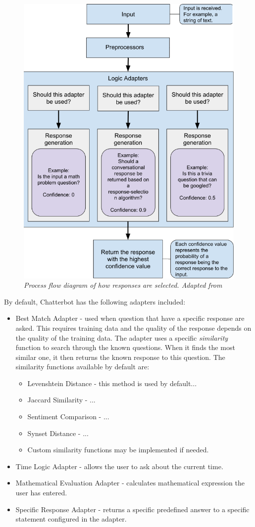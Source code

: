 \documentclass[12pt,a4paper]{article}
\newcommand{\captionstyle}[1] {
    \small{\textit{#1}}
}
\begin{document}
\begin{figure}[!htb]%
    \centering
    \includegraphics[width=0.7\columnwidth]{dialog-processing-flow}%
    \caption{\captionstyle{Process flow diagram of how responses are selected. Adapted from \cite{Chatterbot:online}}}%
    \label{fig:dialog-processing-flow}%
\end{figure}


By default, Chatterbot has the following adapters included:
\begin{itemize}
    \item Best Match Adapter - used when question that have a specific response are asked. This requires training data and the quality of the response depends on the quality of the training data. The adapter uses a specific \textit{similarity} function to search through the known questions. When it finds the most similar one, it then returns the known response to this question. The similarity functions available by default are:
        \begin{itemize}
            \item Levenshtein Distance - this method is used by default...
            \item Jaccard Similarity - ...
            \item Sentiment Comparison - ...
            \item Synset Distance - ...
            \item Custom similarity functions may be implemented if needed.
        \end{itemize}
    \item Time Logic Adapter - allows the user to ask about the current time.
    \item Mathematical Evaluation Adapter - calculates mathematical expression the user has entered.
    \item Specific Response Adapter - returns a specific predefined answer to a specific statement configured in the adapter.
\end{itemize}
\end{document}
